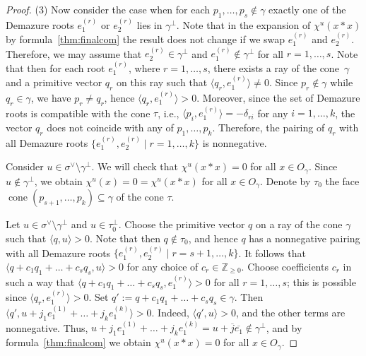 \documentclass[a4paper, 11pt]{amsart}
\theoremstyle{plain}
\theoremstyle{remark}
\theoremstyle{definition}
\newcommand{\ZZ}{\mathbb{Z}}
\newcommand{\ol}[1]{\overline{#1}}
\DeclareMathOperator{\cone}{cone}
\begin{document}
\begin{proof}
\bigskip

(3) Now consider the case when for each $p_1, \ldots, p_s \notin \gamma$ exactly one of the Demazure roots $e_1^{(r)}$ or $e_2^{(r)}$ lies in $\gamma^\perp$. Note that in the expansion of $\chi^u(x*x)$ by formula~\eqref{thm:finalcom} the result does not change if we swap $e_1^{(r)}$ and $e_2^{(r)}$. Therefore, we may assume that $e_2^{(r)} \in \gamma^\perp$ and $e_1^{(r)} \notin \gamma^\perp$ for all $r = 1, \ldots, s$. Note that then for each root $e_1^{(r)}$, where $r = 1, \ldots, s$, there exists a ray of the cone~$\gamma$ and a primitive vector $q_r$ on this ray such that $\langle q_r, e_1^{(r)} \rangle \neq 0$. Since $p_r \notin \gamma$ while $q_r \in \gamma$, we have $p_r \neq q_r$, hence $\langle q_r, e_1^{(r)} \rangle > 0$. Moreover, since the set of Demazure roots is compatible with the cone $\tau$, i.e., $\langle p_i, e_1^{(r)} \rangle = -\delta_{ri}$ for any $i = 1, \ldots, k$, the vector $q_r$ does not coincide with any of $p_1, \ldots, p_k$. Therefore, the pairing of $q_r$ with all Demazure roots $\{e_1^{(r)}, e_2^{(r)} \mid r = 1,\ldots,k\}$ is nonnegative.

Consider $u \in \sigma^\vee \setminus \gamma^\perp$. We will check that $\chi^u(x*x) = 0$ for all $x \in O_\gamma$. Since $u \notin \gamma^\perp$, we obtain $\chi^u(x) = 0 = \chi^u(x*x)$ for all $x \in O_\gamma$. Denote by $\tau_0$ the face $\cone(p_{s+1}, \ldots, p_k) \subseteq \gamma$ of the cone $\tau$.

Let $u \in \sigma^\vee \setminus \gamma^\perp$ and $u \in \tau_0^\perp$. Choose the primitive vector $q$ on a ray of the cone $\gamma$ such that $\langle q, u \rangle > 0$. Note that then $q \notin \tau_0$, and hence $q$ has a nonnegative pairing with all Demazure roots $\{e_1^{(r)}, e_2^{(r)} \mid r = s+1,\ldots,k\}$. It follows that $\langle q + c_1 q_1 + \ldots + c_s q_s, u \rangle > 0$ for any choice of $c_r \in \ZZ_{\geq 0}$. Choose coefficients $c_r$ in such a way that $\langle q + c_1 q_1 + \ldots + c_s q_s, e_1^{(r)} \rangle > 0$ for all $r = 1, \ldots, s$; this is possible since $\langle q_r, e_1^{(r)} \rangle > 0$. Set $q' := q + c_1 q_1 + \ldots + c_s q_s \in \gamma$. Then $\langle q', u + j_1 e_1^{(1)} + \ldots + j_k e_1^{(k)} \rangle > 0$. Indeed, $\langle q', u \rangle > 0$, and the other terms are nonnegative. Thus, $u + j_1 e_1^{(1)} + \ldots + j_k e_1^{(k)} = u + \ol{j} \ol{e_1} \notin \gamma^\perp$, and by formula~\eqref{thm:finalcom} we obtain $\chi^u(x*x) = 0$ for all $x \in O_\gamma$.


\end{proof}
\end{document}
